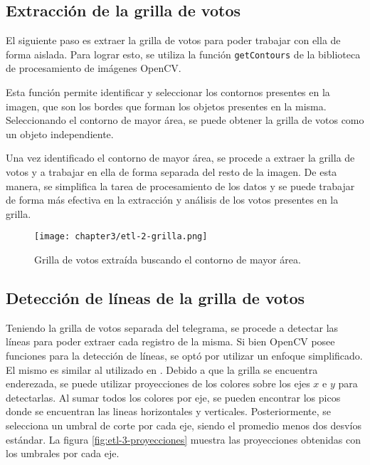 \subsection{Extracción de la grilla de votos}
El siguiente paso es extraer la grilla de votos para poder trabajar con ella de forma aislada. Para lograr esto, se
utiliza la función \verb|getContours| de la biblioteca de procesamiento de imágenes OpenCV.

Esta función permite identificar y seleccionar los contornos presentes en la imagen, que son los bordes que forman los
objetos presentes en la misma. Seleccionando el contorno de mayor área, se puede obtener la grilla de votos como un
objeto independiente.

Una vez identificado el contorno de mayor área, se procede a extraer la grilla de votos y a trabajar en ella de forma
separada del resto de la imagen. De esta manera, se simplifica la tarea de procesamiento de los datos y se puede
trabajar de forma más efectiva en la extracción y análisis de los votos presentes en la grilla.

\begin{figure}[H]
    \centering
    \texttt{[image: chapter3/etl-2-grilla.png]}
    \caption{Grilla de votos extraída buscando el contorno de mayor área.}
    \label{fig:etl-2-grilla}
\end{figure}

\subsection{Detección de líneas de la grilla de votos}
Teniendo la grilla de votos separada del telegrama, se procede a detectar las líneas para poder extraer cada registro
de la misma. Si bien OpenCV posee funciones para la detección de líneas, se optó por utilizar un enfoque simplificado.
El mismo es similar al utilizado en \parencite{lamagna2016lectura}. Debido a que la grilla se encuentra enderezada, se puede utilizar proyecciones de los
colores sobre los ejes $x$ e $y$ para detectarlas. Al sumar todos los colores por eje, se pueden encontrar los picos
donde se encuentran las lineas horizontales y verticales. Posteriormente, se selecciona un umbral de corte por cada
eje, siendo el promedio menos dos desvíos estándar. La figura \ref{fig:etl-3-proyecciones} muestra las proyecciones
obtenidas con los umbrales por cada eje.

